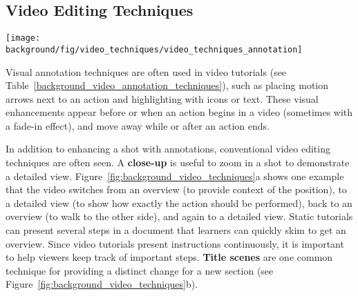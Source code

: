 \clearpage


\subsection{Video Editing Techniques}

\begin{table*}[!b]
  \centering
  \texttt{[image: \\background/fig/video\_techniques/video\_techniques\_annotation]}
  \begin{minipage}{\textwidth}
  \caption[Annotation techniques for static tutorials (listed in Table~\ref{background_annotation_techniques}) are often used in instructional videos, such as arrows and highlights to show product operations.]{
    Annotation techniques for static tutorials (listed in Table~\ref{background_annotation_techniques}) are often used in instructional videos, such as arrows and highlights to show product operations\footnote{``How to use Loola 3 stroller'' by Maxi-Cosi, \url{https://youtu.be/p6MzLXeWBJw}, licensed under CC BY 2.0}.
  }
  \label{background_video_annotation_techniques}
  \end{minipage}
\end{table*}

Visual annotation techniques are often used in video tutorials (see Table~\ref{background_video_annotation_techniques}), such as placing motion arrows next to an action and highlighting with icons or text. These visual enhancements appear before or when an action begins in a video (sometimes with a fade-in effect), and move away while or after an action ends.

In addition to enhancing a shot with annotations, conventional video editing techniques are often seen. A \textbf{close-up} is useful to zoom in a shot to demonstrate a detailed view. Figure~\ref{fig:background_video_techniques}a shows one example that the video switches from an overview (to provide context of the position), to a detailed view (to show how exactly the action should be performed), back to an overview (to walk to the other side), and again to a detailed view.
%
Static tutorials can present several steps in a document that learners can quickly skim to get an overview. Since video tutorials present instructions continuously, it is important to help viewers keep track of important steps. \textbf{Title scenes} are one common technique for providing a distinct change for a new section (see Figure~\ref{fig:background_video_techniques}b).

